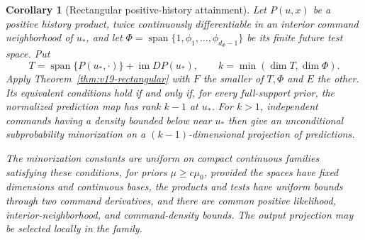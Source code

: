 \documentclass[11pt]{amsart}
\newtheorem{corollary}[theorem]{Corollary}
\theoremstyle{definition}\newtheorem{definition}[theorem]{Definition}
\theoremstyle{remark}\newtheorem{remark}[theorem]{Remark}
\begin{document}
\begin{corollary}[Rectangular positive-history attainment]
\label{cor:v19-rectangular-history}
Let $P(u,x)$ be a positive history product, twice continuously
differentiable in an interior command neighborhood of $u_*$, and let
$\Phi=\operatorname{span}\{1,\phi_1,\ldots,\phi_{d_\Phi-1}\}$
be its finite future test space. Put
\[
 T=\operatorname{span}\{P(u_*,\cdot)\}+\operatorname{im}DP(u_*),
 \qquad k=\min(\dim T,\dim\Phi).
\]
Apply Theorem~\ref{thm:v19-rectangular} with $F$ the smaller of
$T,\Phi$ and $E$ the other. Its equivalent conditions hold if and only
if, for every full-support prior, the normalized prediction map has
rank $k-1$ at $u_*$. For $k>1$, independent commands having a density
bounded below near $u_*$ then give an unconditional subprobability
minorization on a $(k-1)$-dimensional projection of predictions.

The minorization constants are uniform on compact continuous families
satisfying these conditions, for priors $\mu\ge c\mu_0$, provided the
spaces have fixed dimensions and continuous bases, the products and
tests have uniform bounds through two command derivatives, and there
are common positive likelihood, interior-neighborhood, and command-density
bounds. The output projection may be selected locally in the family.
\end{corollary}
\end{document}
